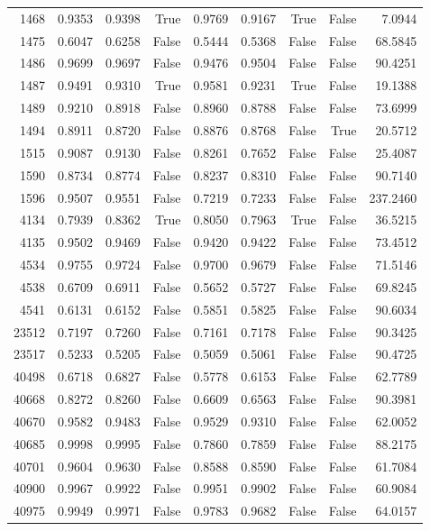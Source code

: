 \begin{longtable}{rrrrrrrrr}
1468 & 0.9353 & 0.9398 & True & 0.9769 & 0.9167 & True & False & 7.0944 \\
1475 & 0.6047 & 0.6258 & False & 0.5444 & 0.5368 & False & False & 68.5845 \\
1486 & 0.9699 & 0.9697 & False & 0.9476 & 0.9504 & False & False & 90.4251 \\
1487 & 0.9491 & 0.9310 & True & 0.9581 & 0.9231 & True & False & 19.1388 \\
1489 & 0.9210 & 0.8918 & False & 0.8960 & 0.8788 & False & False & 73.6999 \\
1494 & 0.8911 & 0.8720 & False & 0.8876 & 0.8768 & False & True & 20.5712 \\
1515 & 0.9087 & 0.9130 & False & 0.8261 & 0.7652 & False & False & 25.4087 \\
1590 & 0.8734 & 0.8774 & False & 0.8237 & 0.8310 & False & False & 90.7140 \\
1596 & 0.9507 & 0.9551 & False & 0.7219 & 0.7233 & False & False & 237.2460 \\
4134 & 0.7939 & 0.8362 & True & 0.8050 & 0.7963 & True & False & 36.5215 \\
4135 & 0.9502 & 0.9469 & False & 0.9420 & 0.9422 & False & False & 73.4512 \\
4534 & 0.9755 & 0.9724 & False & 0.9700 & 0.9679 & False & False & 71.5146 \\
4538 & 0.6709 & 0.6911 & False & 0.5652 & 0.5727 & False & False & 69.8245 \\
4541 & 0.6131 & 0.6152 & False & 0.5851 & 0.5825 & False & False & 90.6034 \\
23512 & 0.7197 & 0.7260 & False & 0.7161 & 0.7178 & False & False & 90.3425 \\
23517 & 0.5233 & 0.5205 & False & 0.5059 & 0.5061 & False & False & 90.4725 \\
40498 & 0.6718 & 0.6827 & False & 0.5778 & 0.6153 & False & False & 62.7789 \\
40668 & 0.8272 & 0.8260 & False & 0.6609 & 0.6563 & False & False & 90.3981 \\
40670 & 0.9582 & 0.9483 & False & 0.9529 & 0.9310 & False & False & 62.0052 \\
40685 & 0.9998 & 0.9995 & False & 0.7860 & 0.7859 & False & False & 88.2175 \\
40701 & 0.9604 & 0.9630 & False & 0.8588 & 0.8590 & False & False & 61.7084 \\
40900 & 0.9967 & 0.9922 & False & 0.9951 & 0.9902 & False & False & 60.9084 \\
40975 & 0.9949 & 0.9971 & False & 0.9783 & 0.9682 & False & False & 64.0157 \\

\end{longtable}
